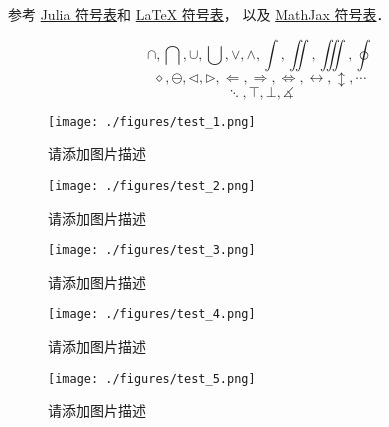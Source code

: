 
参考 \href{https://docs.julialang.org/en/v1/manual/unicode-input/}{Julia 符号表}和 \href{https://oeis.org/wiki/List_of_LaTeX_mathematical_symbols}{LaTeX 符号表}， 以及 \href{http://www.onemathematicalcat.org/MathJaxDocumentation/TeXSyntax.htm#U}{MathJax 符号表}．

\begin{equation}
\cap, \bigcap, \cup, \bigcup, \vee, \wedge, \int, \iint, \iiint, \oint
\end{equation}
\begin{equation}
\diamond, \ominus, \triangleleft, \triangleright, \Longleftarrow, \Longrightarrow, \iff, \leftrightarrow, \updownarrow, \cdots
\end{equation}
\begin{equation}
\ddots, \top, \bot, \measuredangle
\end{equation}

\begin{figure}[ht]
\centering
\texttt{[image: ./figures/test\_1.png]}
\caption{请添加图片描述} \label{test_fig1}
\end{figure}

\begin{figure}[ht]
\centering
\texttt{[image: ./figures/test\_2.png]}
\caption{请添加图片描述} \label{test_fig2}
\end{figure}

\begin{figure}[ht]
\centering
\texttt{[image: ./figures/test\_3.png]}
\caption{请添加图片描述} \label{test_fig3}
\end{figure}

\begin{figure}[ht]
\centering
\texttt{[image: ./figures/test\_4.png]}
\caption{请添加图片描述} \label{test_fig4}
\end{figure}

\begin{figure}[ht]
\centering
\texttt{[image: ./figures/test\_5.png]}
\caption{请添加图片描述} \label{test_fig5}
\end{figure}
